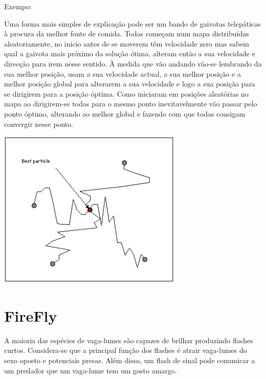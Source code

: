 \documentclass[10pt]{article}
\begin{document}
Exempo:

Uma forma mais simples de explicação pode ser um bando de gaivotas telepáticas à procura da melhor fonte de comida. Todas começam num mapa distribuídas aleatoriamente, no inicio antes de se moverem têm velocidade
zero mas sabem qual a gaivota mais próximo da solução ótima, alteram então a sua velocidade e direcção para
irem nesse sentido. À medida que vão andando vão-se lembrando da sua melhor posição, usam a sua velocidade actual, a sua melhor posição e a melhor posição global para alterarem a sua velocidade e logo a sua
posição para se dirigirem para a posição óptima. Como iniciaram em posições aleatórias no mapa ao dirigirem-se todas para o mesmo ponto inevitavelmente vão passar pelo ponto óptimo, alterando ao
melhor global e fazendo com que todas consigam convergir nesse ponto.

\includegraphics{img/PSO.png}


            

\section{FireFly}\label{sec:FireFly}
A maioria das espécies de vaga-lumes são capazes de brilhar produzindo flashes curtos. Considera-se que a principal função 
dos flashes é atrair vaga-lumes do sexo oposto e potenciais presas. Além disso, um flash de sinal pode comunicar a um 
predador que um vaga-lume tem um gosto amargo. 
\end{document}
